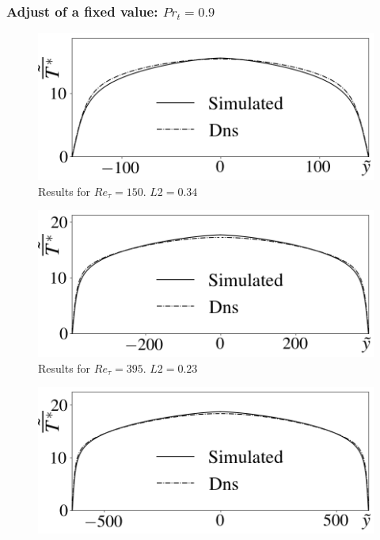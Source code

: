 \documentclass[xcolor=dvipsnames,8pt,aspectratio=34]{beamer}
\begin{document}
		\begin{frame}
		\frametitle{Adjust of a fixed value: $Pr_t = 0.9$}
		\begin{minipage}[h!]{0.49\textwidth}
			 \begin{figure}
			 	\centering
			 	\includegraphics[angle=0, scale=0.24]{fotos_formatacao_final/Temperature_150_071_Prt0905_A26}
			 	\caption{Results for $Re_\tau = 150$. $L2 = 0.34$}
			 \end{figure}
			 \begin{figure}
			 	\centering
			 	\includegraphics[angle=0, scale=0.24]{fotos_formatacao_final/Temperature_395_071_Prt0905_A26}
			 	\caption{Results for $Re_\tau = 395$. $L2 = 0.23$}
			 \end{figure}
		\end{minipage}\hfill
		\begin{minipage}[h!]{0.5\textwidth}
			\begin{figure}
				\centering
				\includegraphics[angle=0, scale=0.24]{fotos_formatacao_final/Temperature_640_071_Prt0905_A26}

\end{figure}
\end{minipage}
\end{frame}
\end{document}
